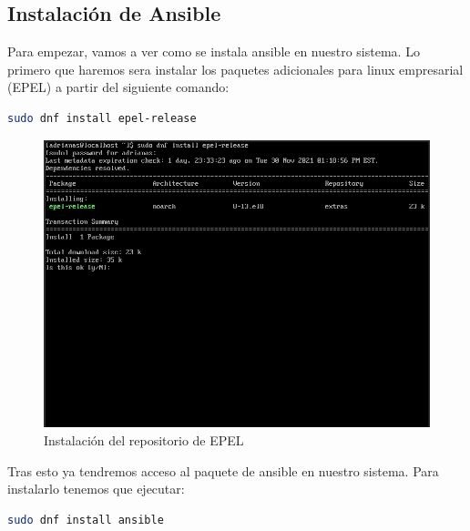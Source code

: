 \subsection{Instalación de Ansible}

Para empezar, vamos a ver como se instala ansible en nuestro sistema. Lo primero que haremos sera instalar los paquetes adicionales para linux empresarial (EPEL) a partir del siguiente comando:

\begin{lstlisting}[language=bash]
	sudo dnf install epel-release
\end{lstlisting}

\begin{figure}[H]
	\centering
	\includegraphics[scale=0.4]{graphics/img13}
	\caption{Instalación del repositorio de EPEL}
\end{figure}

\newpage
Tras esto ya tendremos acceso al paquete de ansible en nuestro sistema. Para instalarlo tenemos que ejecutar:

\begin{lstlisting}[language=bash]
	sudo dnf install ansible 
\end{lstlisting}


